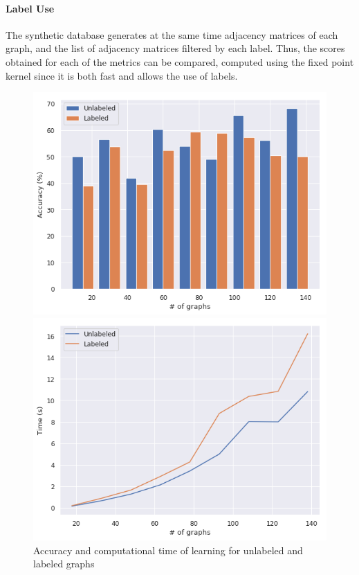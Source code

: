 \documentclass{article}
\theoremstyle{definition}
\begin{document}
\paragraph{Label Use}
The synthetic database generates at the same time adjacency matrices of each graph, and the list of adjacency matrices filtered by each label. Thus, the scores obtained for each of the metrics can be compared, computed using the fixed point kernel since it is both fast and allows the use of labels.
\begin{figure}[!htb]
	\begin{multicols}{2}
		\includegraphics[width=\linewidth]{data/lab_nolab/acc.png}\par
		\includegraphics[width=\linewidth]{data/lab_nolab/time.png}\par
	\end{multicols}
\caption {Accuracy and computational time of learning for unlabeled and labeled graphs}
\end{figure}
\end{document}
